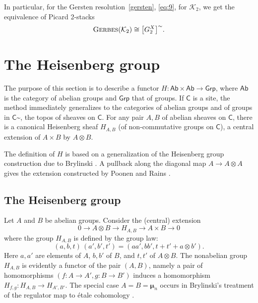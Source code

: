 \documentclass{amsart}
\numberwithin{equation}{subsection}
\theoremstyle{remark}
\theoremstyle{remark}
\newcommand{\cK}{\mathcal{K}}
\newcommand{\Ab}{\mathsf{Ab}} %
\newcommand{\C}{\mathsf{C}} %
\DeclareMathOperator{\ger}{\textsc{Gerbes}} %
\newcommand{\Grp}{\mathsf{Grp}} %
\newcommand{\iso}{\cong}
\newcommand{\mmu}{\boldsymbol{\mu}} %
\newcommand{\shC}{\C\sptilde} %
\begin{document}
In particular, for the Gersten resolution~\eqref{gersten}, \eqref{eq:9}, for $\cK_2$,
we get the equivalence of Picard 2-stacks
\begin{equation}
  \label{eq:8}
  \ger (\cK_2) \iso \bigl[G_2^X \bigr]\sptilde.
\end{equation}


\section{The Heisenberg group}\label{sec:heis}


The purpose of this section is to describe a functor $H\colon \Ab\times \Ab\to \Grp$, where $\Ab$ is the category of abelian groups and $\Grp$ that of groups.
If $\C$ is a site, the method immediately generalizes to the categories of abelian groups and of groups in $\shC$, the topos of sheaves on $\C$. For any pair $A, B$ of abelian sheaves on $\C$, there is a canonical Heisenberg sheaf $H_{A,B}$ (of non-commutative groups on $\C$), a central extension of $A \times B$ by $A\otimes B$.

The definition of $H$ is based on a generalization of the Heisenberg group construction due to Brylinski \cite[\S 5]{Brylinski}. A  pullback along the diagonal map $A \to A\otimes A$ gives the extension constructed by Poonen and Rains \cite{PoonenRains}.



\subsection{The Heisenberg group}
\label{sec:elem}

Let $A$ and $B$ be abelian groups. Consider the (central) extension
\begin{equation}
  \label{eq:1}
  0 \to A\otimes B \to H_{A,B} \to A\times B \to 0
\end{equation}
where the group $H_{A,B}$ is defined by the group law:
\begin{equation}
  \label{eq:2}
  (a,b,t)\, (a',b',t') = (aa',bb',t + t' + a\otimes b').
\end{equation}
Here $a,a'$ are elements of $A$, $b,b'$ of $B$, and $t,t'$ of $A\otimes B$. The nonabelian group $H_{A,B}$ is evidently a functor of the pair $(A,B)$, namely a pair of homomorphisms $(f\colon A\to A', g\colon B\to B')$ induces a homomorphism $H_{f,g}\colon H_{A,B}\to H_{A',B'}$. The special case $A=B=\mmu_n$ occurs in Brylinski's treatment of the regulator map to \'etale cohomology \cite{Brylinski}.
\end{document}
